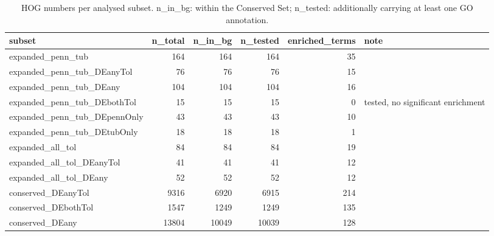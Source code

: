 \begin{table}

\caption{HOG numbers per analysed subset. n_in_bg: within the Conserved Set; n_tested: additionally carrying at least one GO annotation.}
\centering
\begin{tabular}[t]{lrrrrl}
\toprule
subset & n\_total & n\_in\_bg & n\_tested & enriched\_terms & note\\
\midrule
expanded\_penn\_tub & 164 & 164 & 164 & 35 & \\
expanded\_penn\_tub\_DEanyTol & 76 & 76 & 76 & 15 & \\
expanded\_penn\_tub\_DEany & 104 & 104 & 104 & 16 & \\
expanded\_penn\_tub\_DEbothTol & 15 & 15 & 15 & 0 & tested, no significant enrichment\\
expanded\_penn\_tub\_DEpennOnly & 43 & 43 & 43 & 10 & \\
expanded\_penn\_tub\_DEtubOnly & 18 & 18 & 18 & 1 & \\
expanded\_all\_tol & 84 & 84 & 84 & 19 & \\
expanded\_all\_tol\_DEanyTol & 41 & 41 & 41 & 12 & \\
expanded\_all\_tol\_DEany & 52 & 52 & 52 & 12 & \\
conserved\_DEanyTol & 9316 & 6920 & 6915 & 214 & \\
conserved\_DEbothTol & 1547 & 1249 & 1249 & 135 & \\
conserved\_DEany & 13804 & 10049 & 10039 & 128 & \\
\bottomrule
\end{tabular}
\end{table}

